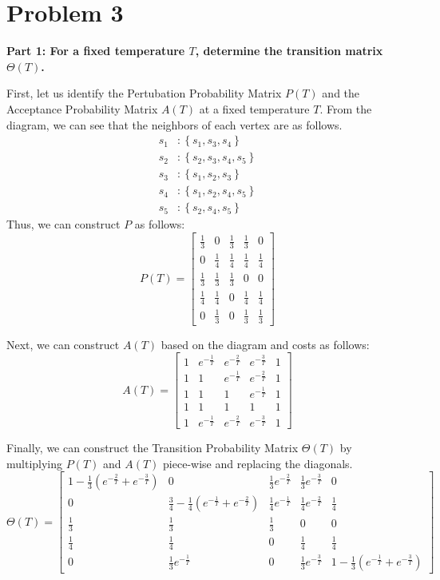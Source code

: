 \section*{Problem 3}

\noindent\textbf{Part 1: For a fixed temperature \(T\), determine the transition matrix \(\Theta(T)\).}

First, let us identify the Pertubation Probability Matrix \(P(T)\) and the Acceptance Probability Matrix \(A(T)\) at a fixed temperature \(T\). From the diagram, we can see that the neighbors of each vertex are as follows.
\[
\begin{aligned}
    s_1 &: \left\{s_1, s_3, s_4\right\} \\
    s_2 &: \left\{s_2, s_3, s_4, s_5\right\} \\
    s_3 &: \left\{s_1, s_2, s_3\right\} \\
    s_4 &: \left\{s_1, s_2, s_4, s_5\right\} \\
    s_5 &: \left\{s_2, s_4, s_5\right\}
\end{aligned}
\]
Thus, we can construct \(P\) as follows:
\[
    P(T) = \begin{bmatrix}
        \frac{1}{3} & 0 & \frac{1}{3} & \frac{1}{3} & 0 \\
        0 & \frac{1}{4} & \frac{1}{4} & \frac{1}{4} & \frac{1}{4} \\
        \frac{1}{3} & \frac{1}{3} & \frac{1}{3} & 0 & 0 \\
        \frac{1}{4} & \frac{1}{4} & 0 & \frac{1}{4} & \frac{1}{4} \\
        0 & \frac{1}{3} & 0 & \frac{1}{3} & \frac{1}{3}
    \end{bmatrix}
\]

Next, we can construct \(A(T)\) based on the diagram and costs as follows:
\[
    A(T) = \begin{bmatrix}
        1 & e^{-\frac1T} & e^{-\frac2T} & e^{-\frac3T} & 1 \\
        1 & 1 & e^{-\frac1T} & e^{-\frac2T} & 1 \\
        1 & 1 & 1 & e^{-\frac1T} & 1 \\
        1 & 1 & 1 & 1 & 1 \\
        1 & e^{-\frac1T} & e^{-\frac2T} & e^{-\frac3T} & 1
    \end{bmatrix}
\]

Finally, we can construct the Transition Probability Matrix \(\Theta(T)\) by multiplying \(P(T)\) and \(A(T)\) piece-wise and replacing the diagonals.
\[
    \Theta(T) = \begin{bmatrix}
        1 - \frac{1}{3}\left(e^{-\frac2T} + e^{-\frac3T}\right) & 0 & \frac{1}{3}e^{-\frac2T} & \frac{1}{3}e^{-\frac3T} & 0 \\
        0 & \frac{3}{4} - \frac{1}{4}\left(e^{-\frac1T} + e^{-\frac2T}\right) & \frac{1}{4}e^{-\frac1T} & \frac14e^{-\frac2T} & \frac14 \\
        \frac13 & \frac13 & \frac13 & 0 & 0 \\
        \frac14 & \frac14 & 0 & \frac14 & \frac14 \\
        0 & \frac13e^{-\frac1T} & 0 & \frac13e^{-\frac3T} & 1 - \frac{1}{3}\left(e^{-\frac1T} + e^{-\frac3T}\right)
    \end{bmatrix}
\]

